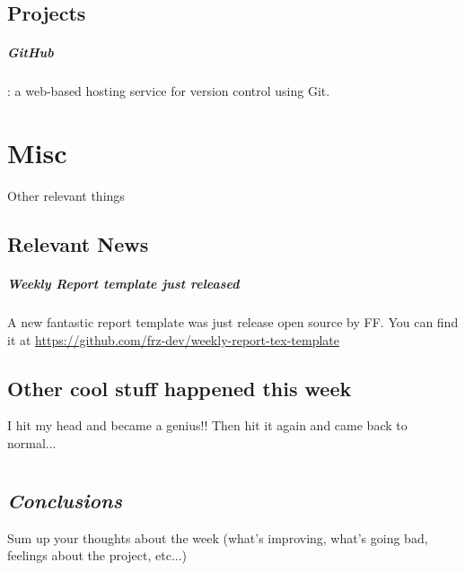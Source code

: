 \section{Projects}
\paragraph{GitHub}: a web-based hosting service for version control using Git.

\chapter{Misc}
Other relevant things
%
\section{Relevant News}
\paragraph{Weekly Report template just released} A new fantastic report template was just release open source by FF. You can find it at \href{https://github.com/frz-dev/weekly-report-tex-template}{https://github.com/frz-dev/weekly-report-tex-template}

\section{Other cool stuff happened this week}
I hit my head and became a genius!! Then hit it again and came back to normal...

\chapter{} %
\section*{\centering \textit{Conclusions}}
Sum up your thoughts about the week (what's improving, what's going bad, feelings about the project, etc...)


\vspace*{50px} %
\printbibliography



